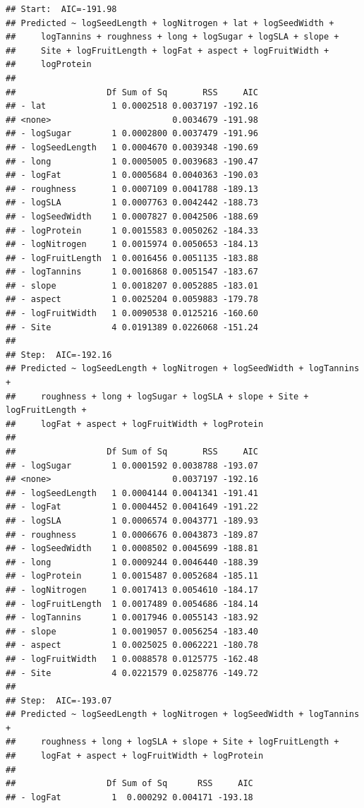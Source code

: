 \documentclass[
  12pt,
]{article}
\begin{document}
\begin{verbatim}
## Start:  AIC=-191.98
## Predicted ~ logSeedLength + logNitrogen + lat + logSeedWidth + 
##     logTannins + roughness + long + logSugar + logSLA + slope + 
##     Site + logFruitLength + logFat + aspect + logFruitWidth + 
##     logProtein
## 
##                  Df Sum of Sq       RSS     AIC
## - lat             1 0.0002518 0.0037197 -192.16
## <none>                        0.0034679 -191.98
## - logSugar        1 0.0002800 0.0037479 -191.96
## - logSeedLength   1 0.0004670 0.0039348 -190.69
## - long            1 0.0005005 0.0039683 -190.47
## - logFat          1 0.0005684 0.0040363 -190.03
## - roughness       1 0.0007109 0.0041788 -189.13
## - logSLA          1 0.0007763 0.0042442 -188.73
## - logSeedWidth    1 0.0007827 0.0042506 -188.69
## - logProtein      1 0.0015583 0.0050262 -184.33
## - logNitrogen     1 0.0015974 0.0050653 -184.13
## - logFruitLength  1 0.0016456 0.0051135 -183.88
## - logTannins      1 0.0016868 0.0051547 -183.67
## - slope           1 0.0018207 0.0052885 -183.01
## - aspect          1 0.0025204 0.0059883 -179.78
## - logFruitWidth   1 0.0090538 0.0125216 -160.60
## - Site            4 0.0191389 0.0226068 -151.24
## 
## Step:  AIC=-192.16
## Predicted ~ logSeedLength + logNitrogen + logSeedWidth + logTannins + 
##     roughness + long + logSugar + logSLA + slope + Site + logFruitLength + 
##     logFat + aspect + logFruitWidth + logProtein
## 
##                  Df Sum of Sq       RSS     AIC
## - logSugar        1 0.0001592 0.0038788 -193.07
## <none>                        0.0037197 -192.16
## - logSeedLength   1 0.0004144 0.0041341 -191.41
## - logFat          1 0.0004452 0.0041649 -191.22
## - logSLA          1 0.0006574 0.0043771 -189.93
## - roughness       1 0.0006676 0.0043873 -189.87
## - logSeedWidth    1 0.0008502 0.0045699 -188.81
## - long            1 0.0009244 0.0046440 -188.39
## - logProtein      1 0.0015487 0.0052684 -185.11
## - logNitrogen     1 0.0017413 0.0054610 -184.17
## - logFruitLength  1 0.0017489 0.0054686 -184.14
## - logTannins      1 0.0017946 0.0055143 -183.92
## - slope           1 0.0019057 0.0056254 -183.40
## - aspect          1 0.0025025 0.0062221 -180.78
## - logFruitWidth   1 0.0088578 0.0125775 -162.48
## - Site            4 0.0221579 0.0258776 -149.72
## 
## Step:  AIC=-193.07
## Predicted ~ logSeedLength + logNitrogen + logSeedWidth + logTannins + 
##     roughness + long + logSLA + slope + Site + logFruitLength + 
##     logFat + aspect + logFruitWidth + logProtein
## 
##                  Df Sum of Sq      RSS     AIC
## - logFat          1  0.000292 0.004171 -193.18

\end{verbatim}
\end{document}
